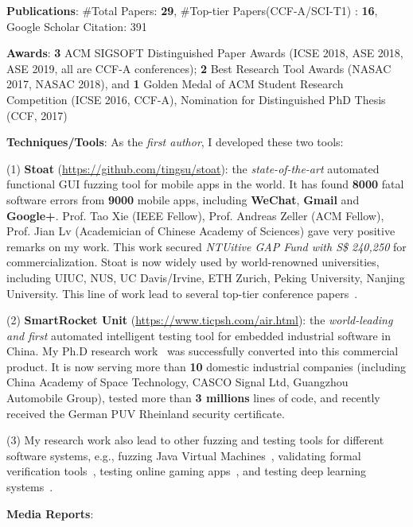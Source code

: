 \documentclass[a4paper]{article}
\begin{document}
{\noindent\textbf{Publications}: \#Total Papers: \textbf{29}, \#Top-tier Papers(CCF-A/SCI-T1) : \textbf{16}, Google Scholar Citation: 391
	
\noindent\textbf{Awards}: \textbf{3} ACM SIGSOFT Distinguished Paper Awards (ICSE 2018, ASE 2018, ASE 2019, all are CCF-A conferences);
 \textbf{2} Best Research Tool Awards (NASAC 2017, NASAC 2018), and \textbf{1} Golden Medal of ACM Student Research Competition (ICSE 2016, CCF-A), Nomination for Distinguished PhD Thesis (CCF, 2017)
 
\noindent\textbf{Techniques/Tools}: As the \emph{first author}, I developed these two tools:

 (1) \textbf{Stoat} (\url{https://github.com/tingsu/stoat}): the \emph{state-of-the-art} automated functional GUI fuzzing tool for mobile apps in the world. It has found \textbf{8000} fatal software errors from \textbf{9000} mobile apps, including \textbf{WeChat}, \textbf{Gmail} and \textbf{Google+}. Prof. Tao Xie (IEEE Fellow), Prof. Andreas Zeller (ACM Fellow), Prof. Jian Lv (Academician of Chinese Academy of Sciences) gave very positive remarks on my work. This work secured \emph{NTUitive GAP Fund with S\$ 240,250} for commercialization. Stoat is now widely used by world-renowned universities, including UIUC, NUS, UC Davis/Irvine, ETH Zurich, Peking University, Nanjing University.
 This line of work lead to several top-tier conference papers~\cite{fsmdroid,stoat,study,study2,apechecker,ausera,recdroid,ui2code,storydroid}.
 
 (2) \textbf{SmartRocket Unit} (\url{https://www.ticpsh.com/air.html}): the \emph{world-leading and first} automated intelligent testing tool for embedded industrial software in China. My Ph.D research work~\cite{sere14,icse15,csur17,scis16,smartunit} was successfully converted into this commercial product. It is now serving more than \textbf{10} domestic industrial companies (including China Academy of Space Technology, CASCO Signal Ltd, Guangzhou Automobile Group), tested more than \textbf{3 millions} lines of code, and recently received the German PUV Rheinland security certificate.
 
 (3) My research work also lead to other fuzzing and testing tools for different software systems, e.g., fuzzing Java Virtual Machines~\cite{classfuzz,classming}, validating formal verification tools~\cite{mcfuzz}, testing online gaming apps~\cite{wuji}, and testing deep learning systems~\cite{deepguage}.
  
\noindent\textbf{Media Reports}:

}
\end{document}

